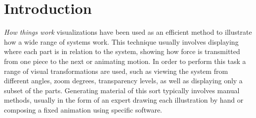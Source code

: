\chapter{Introduction}
\label{ch:intro}

\textit{How things work} visualizations have been used as an efficient method to illustrate how a wide range of systems work.
This technique usually involves displaying where each part is in relation to the system, showing how force is transmitted from one piece to the next or animating motion. 
In order to perform this task a range of visual transformations are used, such as viewing the system from different angles, zoom degrees,  transparency levels, as well as displaying only a subset of the parts.
Generating material of this sort typically involves manual methods, usually in the form of an expert drawing each illustration by hand or composing a fixed animation using specific software.

